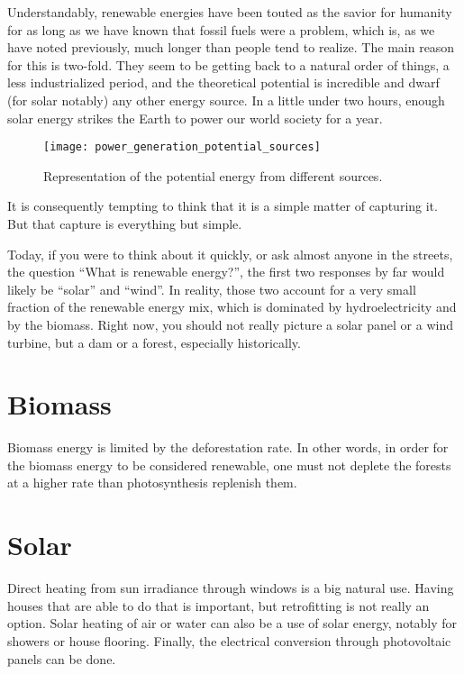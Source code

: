 Understandably, renewable energies have been touted as the savior for humanity for as long as we have known that fossil fuels were a problem, which is, as we have noted previously, much longer than people tend to realize. The main reason for this is two-fold. They seem to be getting back to a natural order of things, a less industrialized period, and the theoretical potential is incredible and dwarf (for solar notably) any other energy source. In a little under two hours, enough solar energy strikes the Earth to power our world society for a year.

\begin{figure}[h]
	\texttt{[image: power\_generation\_potential\_sources]}
	\caption[Representation of the potential energy from different sources]{Representation of the potential energy from different sources.}
\end{figure}

It is consequently tempting to think that it is a simple matter of capturing it. But that capture is everything but simple.

Today, if you were to think about it quickly, or ask almost anyone in the streets, the question “What is renewable energy?”, the first two responses by far would likely be “solar” and “wind”. In reality, those two account for a very small fraction of the renewable energy mix, which is dominated by hydroelectricity and by the biomass. Right now, you should not really picture a solar panel or a wind turbine, but a dam or a forest, especially historically.

\section{Biomass}

Biomass energy is limited by the deforestation rate. In other words, in order for the biomass energy to be considered renewable, one must not deplete the forests at a higher rate than photosynthesis replenish them.

\section{Solar}

Direct heating from sun irradiance through windows is a big natural use. Having houses that are able to do that is important, but retrofitting is not really an option. Solar heating of air or water can also be a use of solar energy, notably for showers or house flooring. Finally, the electrical conversion through photovoltaic panels can be done.


